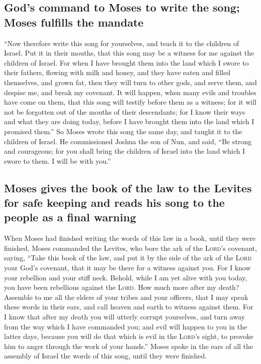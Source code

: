 \hypertarget{gods-command-to-moses-to-write-the-song-moses-fulfills-the-mandate}{%
\subsection{God's command to Moses to write the song; Moses fulfills the
mandate}\label{gods-command-to-moses-to-write-the-song-moses-fulfills-the-mandate}}

 ``Now therefore write this song for yourselves, and
teach it to the children of Israel. Put it in their mouths, that this
song may be a witness for me against the children of Israel.
 For when I have brought them into the land which I swore
to their fathers, flowing with milk and honey, and they have eaten and
filled themselves, and grown fat, then they will turn to other gods, and
serve them, and despise me, and break my covenant.  It
will happen, when many evils and troubles have come on them, that this
song will testify before them as a witness; for it will not be forgotten
out of the mouths of their descendants; for I know their ways and what
they are doing today, before I have brought them into the land which I
promised them.''  So Moses wrote this song the same day,
and taught it to the children of Israel.  He commissioned
Joshua the son of Nun, and said, ``Be strong and courageous; for you
shall bring the children of Israel into the land which I swore to them.
I will be with you.''

\hypertarget{moses-gives-the-book-of-the-law-to-the-levites-for-safe-keeping-and-reads-his-song-to-the-people-as-a-final-warning}{%
\subsection{Moses gives the book of the law to the Levites for safe
keeping and reads his song to the people as a final
warning}\label{moses-gives-the-book-of-the-law-to-the-levites-for-safe-keeping-and-reads-his-song-to-the-people-as-a-final-warning}}

 When Moses had finished writing the words of this law in
a book, until they were finished,  Moses commanded the
Levites, who bore the ark of the \textsc{Lord}'s covenant, saying,
 ``Take this book of the law, and put it by the side of
the ark of the \textsc{Lord} your God's covenant, that it may be there
for a witness against you.  For I know your rebellion and
your stiff neck. Behold, while I am yet alive with you today, you have
been rebellious against the \textsc{Lord}. How much more after my death?
 Assemble to me all the elders of your tribes and your
officers, that I may speak these words in their ears, and call heaven
and earth to witness against them.  For I know that after
my death you will utterly corrupt yourselves, and turn away from the way
which I have commanded you; and evil will happen to you in the latter
days, because you will do that which is evil in the \textsc{Lord}'s
sight, to provoke him to anger through the work of your hands.''
 Moses spoke in the ears of all the assembly of Israel
the words of this song, until they were finished.

